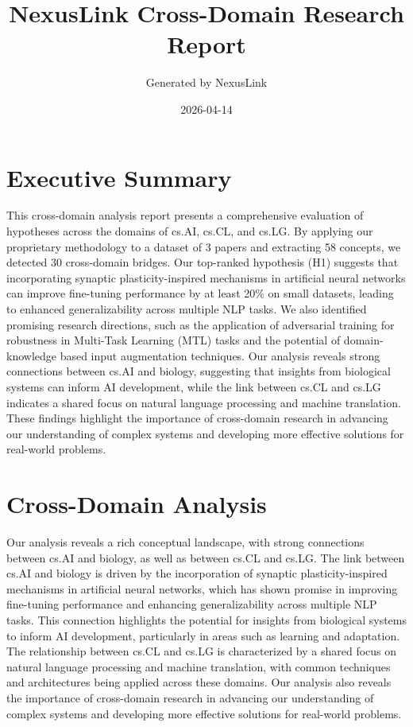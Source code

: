 \documentclass[12pt,a4paper]{article}
\title{NexusLink Cross-Domain Research Report}
\author{Generated by NexusLink}
\date{2026-04-14}
\begin{document}
\maketitle
\tableofcontents
\newpage

\section{Executive Summary}

This cross-domain analysis report presents a comprehensive evaluation of hypotheses across the domains of cs.AI, cs.CL, and cs.LG. By applying our proprietary methodology to a dataset of 3 papers and extracting 58 concepts, we detected 30 cross-domain bridges. Our top-ranked hypothesis (H1) suggests that incorporating synaptic plasticity-inspired mechanisms in artificial neural networks can improve fine-tuning performance by at least 20\% on small datasets, leading to enhanced generalizability across multiple NLP tasks. We also identified promising research directions, such as the application of adversarial training for robustness in Multi-Task Learning (MTL) tasks and the potential of domain-knowledge based input augmentation techniques. Our analysis reveals strong connections between cs.AI and biology, suggesting that insights from biological systems can inform AI development, while the link between cs.CL and cs.LG indicates a shared focus on natural language processing and machine translation. These findings highlight the importance of cross-domain research in advancing our understanding of complex systems and developing more effective solutions for real-world problems.

\section{Cross-Domain Analysis}

Our analysis reveals a rich conceptual landscape, with strong connections between cs.AI and biology, as well as between cs.CL and cs.LG. The link between cs.AI and biology is driven by the incorporation of synaptic plasticity-inspired mechanisms in artificial neural networks, which has shown promise in improving fine-tuning performance and enhancing generalizability across multiple NLP tasks. This connection highlights the potential for insights from biological systems to inform AI development, particularly in areas such as learning and adaptation. The relationship between cs.CL and cs.LG is characterized by a shared focus on natural language processing and machine translation, with common techniques and architectures being applied across these domains. Our analysis also reveals the importance of cross-domain research in advancing our understanding of complex systems and developing more effective solutions for real-world problems.
\end{document}

